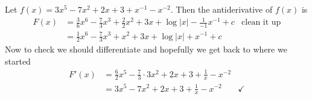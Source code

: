 \begin{eg}\label{eg antidiff poly}
 Let $f(x) = 3x^5-7x^2+2x+3 + x^{-1} - x^{-2}$. Then the antiderivative of $f(x)$ is
\begin{align*}
  F(x) &= \frac{3}{6}x^6 - \frac{7}{3}x^3 + \frac{2}{2}x^2 + 3x +\log|x| - \frac{1}{-1}
x^{-1} + c & \text{clean it up}\\
  &= \frac{1}{2}x^6 - \frac{7}{3}x^3 +  x^2 + 3x +\log|x| + x^{-1} + c
\end{align*}
Now to check we should differentiate and hopefully we get back to where we started
\begin{align*}
  F'(x) &= \frac{6}{2}x^5 - \frac{7}{3} \cdot 3 x^2 +  2 x + 3 + \frac{1}{x} - x^{-2}\\
  &= 3 x^5 - 7 x^2 +  2 x + 3 + \frac{1}{x} - x^{-2} & \checkmark
\end{align*}
\end{eg}

